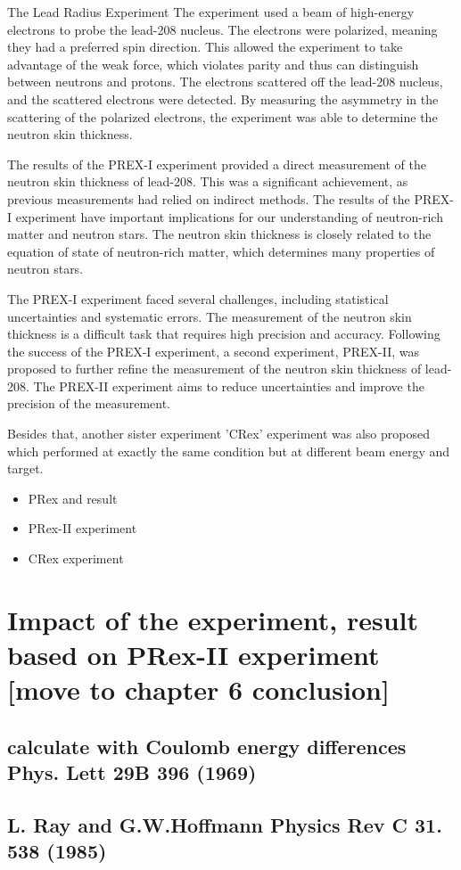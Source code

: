 The Lead Radius Experiment The experiment used a beam of high-energy electrons to probe the lead-208 nucleus. The electrons were polarized, meaning they had a preferred spin direction. This allowed the experiment to take advantage of the weak force, which violates parity and thus can distinguish between neutrons and protons. The electrons scattered off the lead-208 nucleus, and the scattered electrons were detected. By measuring the asymmetry in the scattering of the polarized electrons, the experiment was able to determine the neutron skin thickness.

The results of the PREX-I experiment provided a direct measurement of the neutron skin thickness of lead-208. This was a significant achievement, as previous measurements had relied on indirect methods. The results of the PREX-I experiment have important implications for our understanding of neutron-rich matter and neutron stars. The neutron skin thickness is closely related to the equation of state of neutron-rich matter, which determines many properties of neutron stars.

The PREX-I experiment faced several challenges, including statistical uncertainties and systematic errors. The measurement of the neutron skin thickness is a difficult task that requires high precision and accuracy.  Following the success of the PREX-I experiment, a second experiment, PREX-II, was proposed to further refine the measurement of the neutron skin thickness of lead-208. The PREX-II experiment aims to reduce uncertainties and improve the precision of the measurement.

Besides that, another sister experiment 'CRex' experiment was also proposed which performed at exactly the same condition but at different beam energy and target. 

\begin{itemize}
    \item PRex and result
\end{itemize}

\begin{itemize}
    \item PRex-II experiment 
\end{itemize}

\begin{itemize}
    \item CRex experiment
\end{itemize}


\section{Impact of the experiment, result based on PRex-II experiment [move to chapter 6 conclusion]}

\subsection{calculate with Coulomb energy differences Phys. Lett 29B 396 (1969)}
\subsection{L. Ray and G.W.Hoffmann Physics Rev C 31. 538 (1985)}